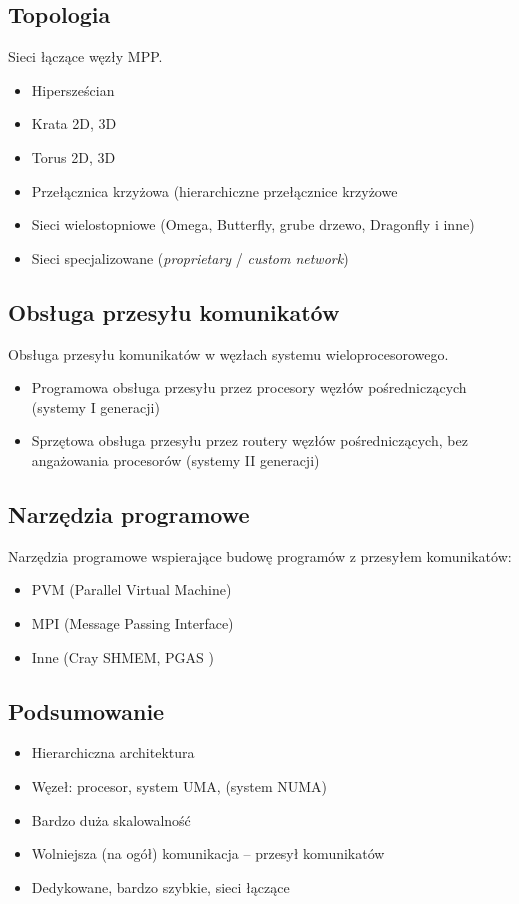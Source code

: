 		\subsection{Topologia}
			Sieci łączące węzły MPP.
			\begin{itemize}
				\item Hipersześcian
				\item Krata 2D, 3D
				\item Torus 2D, 3D
				\item Przełącznica krzyżowa (hierarchiczne przełącznice krzyżowe
				\item Sieci wielostopniowe (Omega, Butterfly, grube drzewo, Dragonfly i inne)
				\item Sieci specjalizowane (\emph{proprietary} / \emph{custom network})
			\end{itemize}
		\subsection{Obsługa przesyłu komunikatów}
			Obsługa przesyłu komunikatów w węzłach systemu wieloprocesorowego.
			\begin{itemize}
				\item Programowa obsługa przesyłu przez procesory węzłów pośredniczących (systemy I generacji)
				\item Sprzętowa obsługa przesyłu przez routery węzłów pośredniczących, bez angażowania procesorów (systemy II generacji)
			\end{itemize}
		\subsection{Narzędzia programowe}
			Narzędzia programowe wspierające budowę programów z przesyłem komunikatów:
			\begin{itemize}
				\item PVM (Parallel Virtual Machine)
				\item MPI (Message Passing Interface)
				\item Inne (Cray SHMEM, PGAS )
			\end{itemize}
		\subsection{Podsumowanie}
			\begin{itemize}
				\item Hierarchiczna architektura
				\item Węzeł: procesor, system UMA, (system NUMA)
				\item Bardzo duża skalowalność
				\item Wolniejsza (na ogół) komunikacja – przesył komunikatów
				\item Dedykowane, bardzo szybkie, sieci łączące
			\end{itemize}
			
